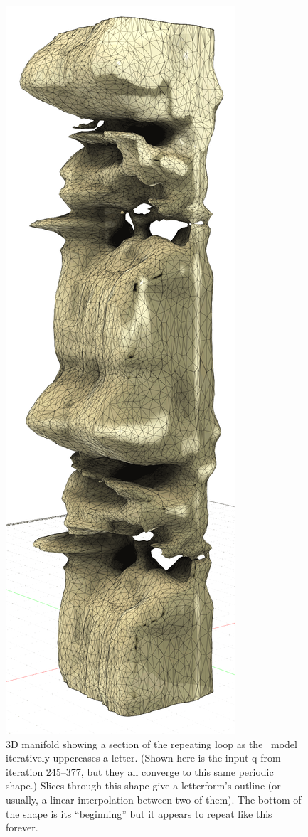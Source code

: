 \documentclass[twocolumn]{article}
\begin{document}
\begin{figure}[t]
\centering
  \includegraphics[width=0.7 \linewidth]{uppestcase3d}
\caption{ 3D manifold showing a section of the repeating loop as the
  \makeuppercase\ model iteratively uppercases a letter. (Shown here
  is the input \lowercase{q} from iteration 245--377, but they all
  converge to this same periodic shape.) Slices through this shape give a
  letterform's outline (or usually, a linear interpolation between two
  of them). The bottom of the shape is its ``beginning'' but it
  appears to repeat like this forever.
} \label{fig:uppestcase3d}
\end{figure}
\end{document}
